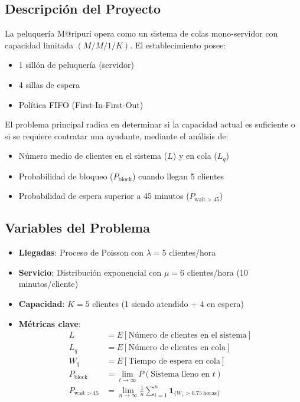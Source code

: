 \documentclass{article}
\begin{document}
\subsection{Descripción del Proyecto}
La peluquería M@ripuri opera como un sistema de colas mono-servidor con capacidad limitada $(M/M/1/K)$. El establecimiento posee:
\begin{itemize}
    \item 1 sillón de peluquería (servidor)
    \item 4 sillas de espera
    \item Política FIFO (First-In-First-Out)
\end{itemize}

El problema principal radica en determinar si la capacidad actual es suficiente o si se requiere contratar una ayudante, mediante el análisis de:
\begin{itemize}
    \item Número medio de clientes en el sistema ($L$) y en cola ($L_q$)
    \item Probabilidad de bloqueo ($P_{\text{block}}$) cuando llegan 5 clientes
    \item Probabilidad de espera superior a 45 minutos ($P_{\text{wait}>45}$)
\end{itemize}

\subsection{Variables del Problema}
\begin{itemize}
    \item \textbf{Llegadas}: Proceso de Poisson con $\lambda = 5$ clientes/hora
    \item \textbf{Servicio}: Distribución exponencial con $\mu = 6$ clientes/hora (10 minutos/cliente)
    \item \textbf{Capacidad}: $K = 5$ clientes (1 siendo atendido + 4 en espera)
    \item \textbf{Métricas clave}:
    \begin{align*}
        L &= E[\text{Número de clientes en el sistema}] \\
        L_q &= E[\text{Número de clientes en cola}] \\
        W_q &= E[\text{Tiempo de espera en cola}] \\
        P_{\text{block}} &= \lim_{t\to\infty} P(\text{Sistema lleno en } t) \\
        P_{\text{wait}>45} &= \lim_{n\to\infty} \frac{1}{n}\sum_{i=1}^n \mathbf{1}_{\{W_i > 0.75\ \text{horas}\}}
    \end{align*}
\end{itemize}
\end{document}
